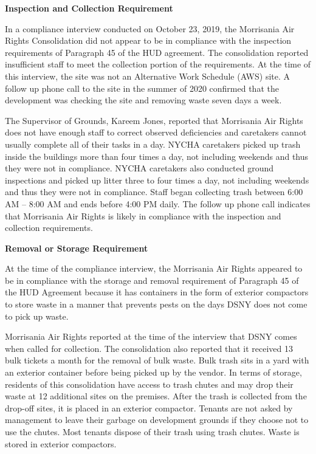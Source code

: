 
\textbf{Inspection and Collection Requirement}

In a compliance interview conducted on October 23, 2019, the Morrisania Air Rights Consolidation did not appear to be in compliance with the inspection requirements of Paragraph 45 of the HUD agreement. The consolidation reported insufficient staff to meet the collection portion of the requirements. At the time of this interview, the site was not an Alternative Work Schedule (AWS) site.  A follow up phone call to the site in the summer of 2020 confirmed that the development was checking the site and removing waste seven days a week.

The Supervisor of Grounds, Kareem Jones, reported that Morrisania Air Rights does not have enough staff to correct observed deficiencies and caretakers cannot usually complete all of their tasks in a day. NYCHA caretakers picked up trash inside the buildings more than four times a day, not including weekends and thus they were not in compliance. NYCHA caretakers also conducted ground inspections and picked up litter three to four times a day, not including weekends and thus they were not in compliance. Staff began collecting trash between 6:00 AM -- 8:00 AM and ends before 4:00 PM daily. The follow up phone call indicates that Morrisania Air Rights is likely in compliance with the inspection and collection requirements.

\textbf{Removal or Storage Requirement}

At the time of the compliance interview, the Morrisania Air Rights appeared to be in compliance with the storage and removal requirement of Paragraph 45 of the HUD Agreement because it has containers in the form of exterior compactors to store waste in a manner that prevents pests on the days DSNY does not come to pick up waste.

Morrisania Air Rights reported at the time of the interview that DSNY comes when called for collection. The consolidation also reported that it received 13 bulk tickets a month for the removal of bulk waste. Bulk trash sits in a yard with an exterior container before being picked up by the vendor. In terms of storage, residents of this consolidation have access to trash chutes and may drop their waste at 12 additional sites on the premises. After the trash is collected from the drop-off sites, it is placed in an exterior compactor. Tenants are not asked by management to leave their garbage on development grounds if they choose not to use the chutes. Most tenants dispose of their trash using trash chutes. Waste is stored in exterior compactors. 


